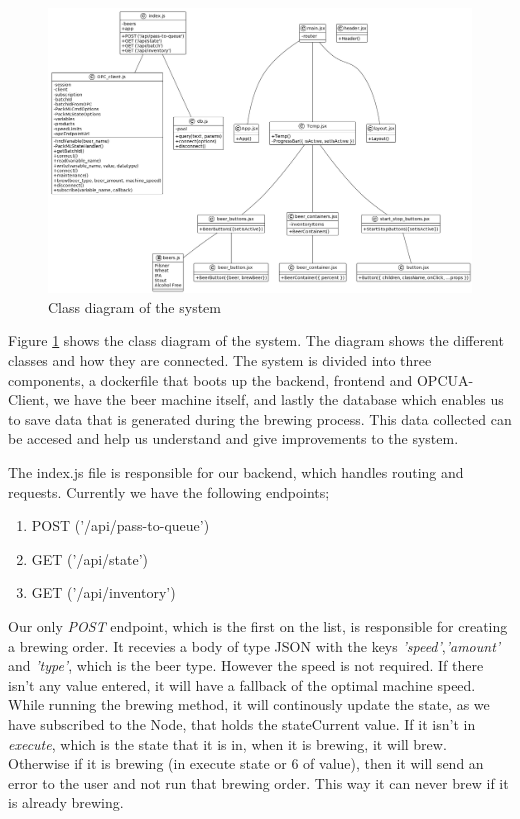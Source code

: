 
\begin{center}
    \centering
    \begin{figure}[H]
        \includegraphics[width=1\textwidth]{img/class_diagram.png}
        \caption{Class diagram of the system}
        \label{fig:class_diagram}
    \end{figure}
\end{center}
Figure \ref{fig:class_diagram} shows the class diagram of the system. The diagram shows the different classes and how they are connected. The system is divided into three components, a dockerfile that boots up the backend, frontend and OPCUA-Client, we have the beer machine itself, and lastly the database which enables us to save data that is generated during the brewing process. This data collected can be accesed and help us understand and give improvements to the system.


The index.js file is responsible for our backend, which handles routing and requests. Currently we have the following endpoints;
\begin{enumerate}
    \item {POST ('/api/pass-to-queue')}
    \item {GET ('/api/state')}
    \item {GET ('/api/inventory')}
\end{enumerate}

Our only \textit{POST} endpoint, which is the first on the list, is responsible for creating a brewing order. It recevies a body of type JSON with the keys \textit{'speed'},\textit{'amount'} and \textit{'type'}, which is the beer type. However the speed is not required. If there isn't any value entered, it will have a fallback of the optimal machine speed.
While running the brewing method, it will continously update the state, as we have subscribed to the Node, that holds the stateCurrent value. If it isn't in \textit{execute}, which is the state that it is in, when it is brewing, it will brew. Otherwise if it is brewing (in execute state or 6 of value), then it will send an error to the user and not run that brewing order.
This way it can never brew if it is already brewing. \newline

